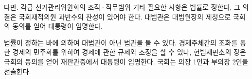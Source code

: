 다만. 각급 선거관리위원회의 조직·직무범위 기타 필요한 사항은 법률로 정한다, 그 의결은 국회재적의원 과반수의 찬성이 있어야 한다. 대법관은 대법원장의 제청으로 국회의 동의를 얻어 대통령이 임명한다.

법률이 정하는 바에 의하여 대법관이 아닌 법관을 둘 수 있다. 경제주체간의 조화를 통한 경제의 민주화를 위하여 경제에 관한 규제와 조정을 할 수 있다, 헌법재판소의 장은 국회의 동의를 얻어 재판관중에서 대통령이 임명한다. 국회는 의장 1인과 부의장 2인을 선출한다.
